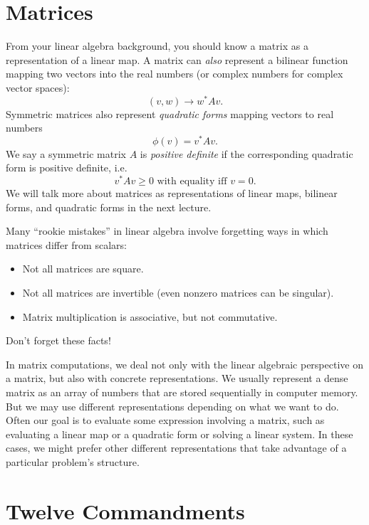 \documentclass[12pt, leqno]{article}
\begin{document}

\section{Matrices}

From your linear algebra background, you should know a matrix as a
representation of a linear map.  A matrix can {\em also} represent a
bilinear function mapping two vectors into the real numbers (or
complex numbers for complex vector spaces):
\[
  (v, w) \rightarrow w^* A v.
\]
Symmetric matrices also represent {\em quadratic forms} mapping
vectors to real numbers
\[
  \phi(v) = v^* A v.
\]
We say a symmetric matrix $A$ is {\em positive definite} if the
corresponding quadratic form is positive definite, i.e.
\[
  v^* A v \geq 0 \mbox{ with equality iff } v = 0.
\]
We will talk more about matrices as representations of linear maps,
bilinear forms, and quadratic forms in the next lecture.

Many ``rookie mistakes'' in linear algebra involve forgetting ways in
which matrices differ from scalars:
\begin{itemize}
\item Not all matrices are square.
\item Not all matrices are invertible (even nonzero matrices can be
  singular).
\item Matrix multiplication is associative, but not commutative.
\end{itemize}
Don't forget these facts!

In matrix computations, we deal not only with the linear algebraic
perspective on a matrix, but also with concrete representations.  We
usually represent a dense matrix as an array of numbers that are
stored sequentially in computer memory.  But we may use different
representations depending on what we want to do.  Often our goal is to
evaluate some expression involving a matrix, such as evaluating a
linear map or a quadratic form or solving a linear system.  In these
cases, we might prefer other different representations that take
advantage of a particular problem's structure.

\section{Twelve Commandments}
\end{document}
